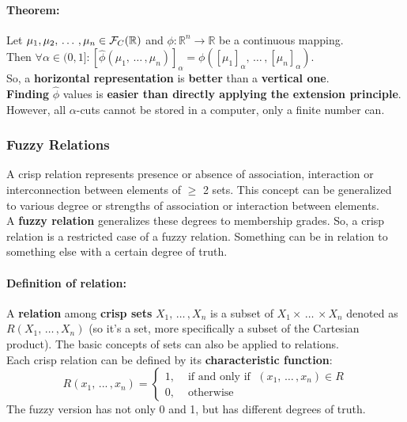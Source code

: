 \paragraph{Theorem:} Let $\mu_1, \mu_2, \, \dots \, , \mu_n \in \mathcal{F}_C (\mathbb{R})$ and $\phi: \mathbb{R}^n \rightarrow \mathbb{R}$ be a continuous mapping. \\
Then $\forall \alpha \in (0,1]: [\hat \phi (\mu_1, \, \dots \, , \mu_n)]_\alpha = \phi ([\mu_1]_\alpha, \, \dots \, , [\mu_n]_\alpha)$.\\

So, a \textbf{horizontal representation} is \textbf{better} than a \textbf{vertical one}.\\

\textbf{Finding} $\hat{\phi}$ values is \textbf{easier than directly applying the extension principle}.\\

However, all $\alpha$-cuts cannot be stored in a computer, only a finite number can.\\

\newpage

\subsubsection{Fuzzy Relations}

A crisp relation represents presence or absence of association, interaction or interconnection between elements of $\geq$ 2 sets. This concept can be generalized to various degree or strengths of association or interaction between elements.\\

A \textbf{fuzzy relation} generalizes these degrees to membership grades. So, a crisp relation is a restricted case of a fuzzy relation. Something can be in relation to something else with a certain degree of truth.\\

\paragraph{Definition of relation:} A \textbf{relation} among \textbf{crisp sets} $X_1, \, \dots \, , X_n$ is a subset of $X_1 \times \, \dots \, \times X_n$ denoted as $R(X_1, \, \dots \, , X_n)$ (so it's a set, more specifically a subset of the Cartesian product). The basic concepts of sets can also be applied to relations.\\

Each crisp relation can be defined by its \textbf{characteristic function}: 
$$ R(x_1, \, ... \, , x_n) = \begin{cases}
	1, & \text{ if and only if } \; (x_1, \, \dots \, , x_n) \in R \\
	0, & \text{ otherwise}
\end{cases}$$
The fuzzy version has not only 0 and 1, but has different degrees of truth.\\

